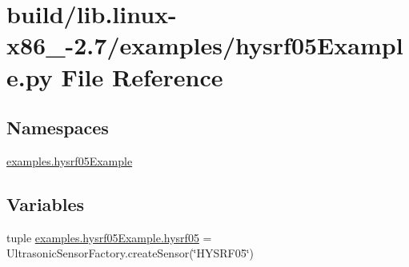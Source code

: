 \hypertarget{build_2lib_8linux-x86__64-2_87_2examples_2hysrf05Example_8py}{}\section{build/lib.linux-\/x86\+\_-\/2.7/examples/hysrf05\+Example.py File Reference}
\label{build_2lib_8linux-x86__64-2_87_2examples_2hysrf05Example_8py}
\subsection*{Namespaces}
\begin{DoxyCompactItemize}
\item 
 \hyperlink{namespaceexamples_1_1hysrf05Example}{examples.\+hysrf05\+Example}
\end{DoxyCompactItemize}
\subsection*{Variables}
\begin{DoxyCompactItemize}
\item 
tuple \hyperlink{namespaceexamples_1_1hysrf05Example_a5521137994b201fb266067bebb975ea7}{examples.\+hysrf05\+Example.\+hysrf05} = Ultrasonic\+Sensor\+Factory.\+create\+Sensor(\char`\"{}H\+Y\+S\+R\+F05\char`\"{})
\end{DoxyCompactItemize}
